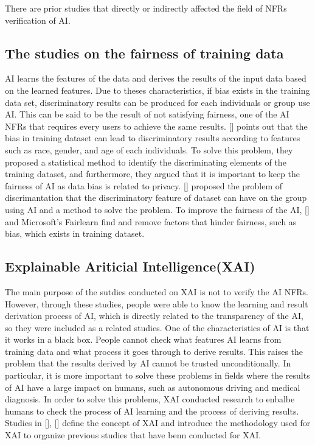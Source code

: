\documentclass[journal,article,submit,moreauthors,pdftex]{Definitions/mdpi}
\begin{document}
There are prior studies that directly or indirectly affected the field of NFRs verification of AI.


\subsection{The studies on the fairness of training data}

AI learns the features of the data and derives the results of the input data based on the learned features. Due to theses characteristics, if bias exists in the training data set, discriminatory results can be produced for each individuals or group use AI.
This can be said to be the result of not satisfying fairness, one of the AI NFRs that requires every users to achieve the same results.
[] points out that the bias in training dataset can lead to discriminatory results according to features such as race, gender, and age of each individuals.
To solve this problem, they proposed a statistical method to identify the discriminating elements of the training dataset, and furthermore, they argued that it is important to keep the fairness of AI as data bias is related to privacy.
[] proposed the problem of discrimantation that the discriminatory feature of dataset can have on the group using AI and a method to solve the problem.
To improve the fairness of the AI, [] and Microsoft's Fairlearn find and remove factors that hinder fairness, such as bias, which exists in training dataset.

\subsection{Explainable Ariticial Intelligence(XAI)}

The main purpose of the sutdies conducted on XAI is not to verify the AI NFRs.
However, through these studies, people were able to know the learning and result derivation process of AI, which is directly related to the transparency of the AI, so they were included as a related studies.
One of the characteristics of AI is that it works in a black box. People cannot check what features AI learns from training data and what process it goes through to derive results.
This raises the problem that the results derived by AI cannot be trusted unconditionally.
In particular, it is more important to solve these problems in fields where the results of AI have a large impact on humans, such as autonomous driving and medical diagnosis.
In order to solve this problems, XAI conducted research to enbalbe humans to check the process of AI learning and the process of deriving results.
Studies in [], [] define the concept of XAI and introduce the methodology used for XAI to organize previous studies that have benn conducted for XAI.
\end{document}
